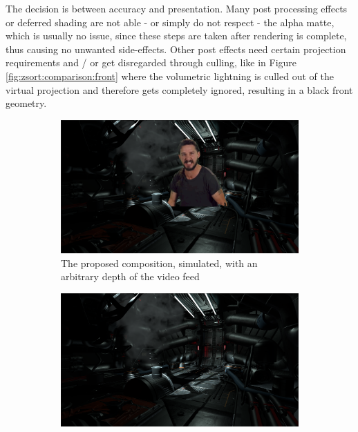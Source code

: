 The decision is between accuracy and presentation. Many post processing effects 
or deferred shading are not able - or simply do not respect - the alpha matte, 
which is usually no issue, since these steps are taken after rendering is 
complete, thus causing no unwanted side-effects. Other post effects need 
certain projection requirements and / or get disregarded through culling, like 
in Figure \ref{fig:zsort:comparison:front} where the volumetric lightning is 
culled out of the virtual projection and therefore gets completely ignored, 
resulting in a black front geometry.

\begin{figure}[htbp]
	\caption{A comparison of different composition methods in engine}
	\label{fig:zsort:comparison}
	\begin{subfigure}[t]{.45\textwidth}
		\centering
		\includegraphics[width=\textwidth]{_raw_resources/composition/Composition-Perfect-Realigned.png}
		\caption{The proposed composition, simulated, with an arbitrary depth 
		of the video feed}
	\end{subfigure}
	\begin{subfigure}[t]{.45\textwidth}
		\centering
		\includegraphics[width=\textwidth]{_raw_resources/composition/Composition-Full-Render.png}

\end{subfigure}
\end{figure}
